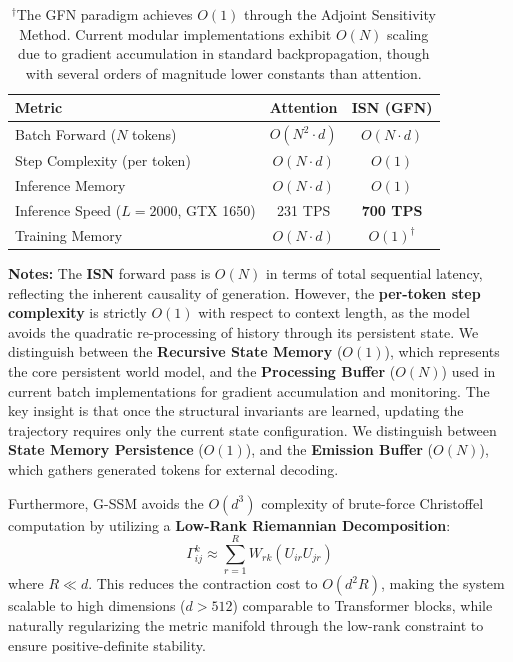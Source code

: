 \documentclass[12pt,a4paper]{article}
\begin{document}
\begin{table}[htbp]
    \centering
    \caption{Complexity comparison between attention mechanism and geometric interaction.}
    \label{tab:complexity}
    \begin{tabular}{lcc}
        \toprule
        \textbf{Metric} & \textbf{Attention} & \textbf{ISN (GFN)} \\
        \midrule
        Batch Forward ($N$ tokens) & $O(N^2 \cdot d)$ & $O(N \cdot d)$ \\
        Step Complexity (per token) & $O(N \cdot d)$ & \textbf{$O(1)$} \\
        Inference Memory & $O(N \cdot d)$ & \textbf{$O(1)$} \\
        Inference Speed ($L=2000$, GTX 1650) & 231 TPS & \textbf{700 TPS} \\
        Training Memory & $O(N \cdot d)$ & $O(1)^\dagger$ \\
        \bottomrule
    \end{tabular}
    \vspace{2pt}
    \caption*{\small $^\dagger$The GFN paradigm achieves $O(1)$ through the Adjoint Sensitivity Method. Current modular implementations exhibit $O(N)$ scaling due to gradient accumulation in standard backpropagation, though with several orders of magnitude lower constants than attention.}
\end{table}

\noindent \textbf{Notes:} The \textbf{ISN} forward pass is $O(N)$ in terms of total sequential latency, reflecting the inherent causality of generation. However, the \textbf{per-token step complexity} is strictly $O(1)$ with respect to context length, as the model avoids the quadratic re-processing of history through its persistent state. We distinguish between the \textbf{Recursive State Memory} ($O(1)$), which represents the core persistent world model, and the \textbf{Processing Buffer} ($O(N)$) used in current batch implementations for gradient accumulation and monitoring. The key insight is that once the structural invariants are learned, updating the trajectory requires only the current state configuration. We distinguish between \textbf{State Memory Persistence} ($O(1)$), and the \textbf{Emission Buffer} ($O(N)$), which gathers generated tokens for external decoding.

Furthermore, G-SSM avoids the $O(d^3)$ complexity of brute-force Christoffel computation by utilizing a \textbf{Low-Rank Riemannian Decomposition}:
\begin{equation}
    \Gamma^k_{ij} \approx \sum_{r=1}^R W_{rk} (U_{ir} U_{jr})
    \label{eq:low-rank}
\end{equation}
where $R \ll d$. This reduces the contraction cost to $O(d^2 R)$, making the system scalable to high dimensions ($d > 512$) comparable to Transformer blocks, while naturally regularizing the metric manifold through the low-rank constraint to ensure positive-definite stability.
\end{document}
